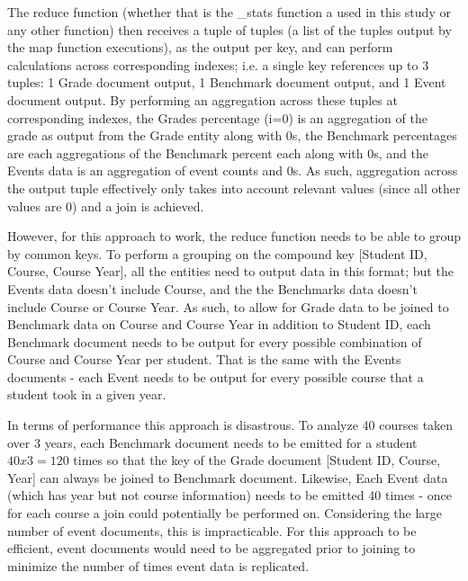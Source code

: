 The reduce function (whether that is the \_stats function a used in this study or any other function) then receives a tuple of tuples (a list of the tuples output by the map function executions), as the output per key, and can perform calculations across corresponding indexes; i.e. a single key references up to 3 tuples: 1 Grade document output, 1 Benchmark document output, and 1 Event document output. By performing an aggregation across these tuples at corresponding indexes, the Grades percentage (i=0) is an aggregation of the grade as output from the Grade entity along with 0s, the Benchmark percentages are each aggregations of the Benchmark percent each along with 0s, and the Events data is an aggregation of event counts and 0s. As such, aggregation across the output tuple effectively only takes into account relevant values (since all other values are 0) and a join is achieved.

However, for this approach to work, the reduce function needs to be able to group by common keys. To perform a grouping on the compound key [Student ID, Course, Course Year], all the entities need to output data in this format; but the Events data doesn't include Course, and the the Benchmarks data doesn't include Course or Course Year. As such, to allow for Grade data to be joined to Benchmark data on Course and Course Year in addition to Student ID, each Benchmark document needs to be output for every possible combination of Course and Course Year per student. That is the same with the Events documents - each Event needs to be output for every possible course that a student took in a given year.

In terms of performance this approach is disastrous. To analyze 40 courses taken over 3 years, each Benchmark document needs to be emitted for a student $40 x 3 = 120$ times so that the key of the Grade document [Student ID, Course, Year] can always be joined to Benchmark document. Likewise, Each Event data (which has year but not course information) needs to be emitted 40 times - once for each course a join could potentially be performed on. Considering the large number of event documents, this is impracticable. For this approach to be efficient, event documents would need to be aggregated prior to joining to minimize the number of times event data is replicated.

